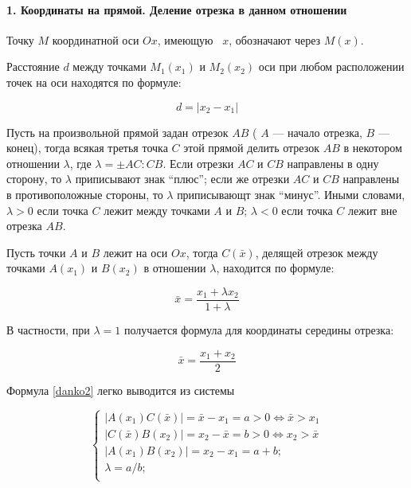 \secdown


\paragraph{1. Координаты на прямой. Деление отрезка в данном отношении}

Точку $M$ координатной оси $Ox$, имеющую \ $x$,
обозначают через $M(x)$.

Расстояние $d$ между точками $M_{1}(x_{1})$ и $M_{2}(x_{2})$ оси при любом
расположении точек на оси находятся по формуле:

\begin{equation}\label{danko1}
d=|x_{2}-x_{1}|
\end{equation}

Пусть на произвольной прямой задан отрезок $AB$ ( $A$ --- начало отрезка, $B$
--- конец), тогда всякая третья точка $C$ этой прямой делить отрезок $AB$ в
некотором отношении $\lambda$, где $\lambda= \pm AC:CB$. Если отрезки $AC$ и
$CB$ направлены в одну сторону, то $\lambda$ приписывают знак ``плюс''; если же
отрезки $AC$ и $CB$ направлены в противоположные стороны, то $\lambda$
приписывающт знак ``минус''. Иными словами, $\lambda>0$ если точка $C$ лежит
между точками $A$ и $B$; $\lambda < 0$ если точка $C$ лежит вне отрезка $AB$.

Пусть точки $A$ и $B$ лежит на оси $Ox$, тогда  $C(\bar{x})$, делящей отрезок между точками $A(x_1)$ и
$B(x_2)$ в отношении $\lambda$, находится по формуле:

\begin{equation}\label{danko2}
\bar x=\frac{x_1+\lambda x_2}{1+\lambda}
\end{equation}

В частности, при $\lambda=1$ получается формула для координаты середины отрезка:

\begin{equation}
\bar x = \frac{x_1+x_2}{2}
\end{equation}

Формула \ref{danko2} легко выводится из системы

\begin{equation*}
\begin{cases}
|A(x_1)C(\bar x)| = \bar x - x_1 = a >0 \Leftrightarrow \bar x > x_1\\
|C(\bar x)B(x_2)| = x_2 - \bar x = b >0 \Leftrightarrow x_2 > \bar x\\
|A(x_1)B(x_2)| = x_2 - x_1 = a+b;\\
\lambda = a/b;\\ 
\end{cases}
\end{equation*}

